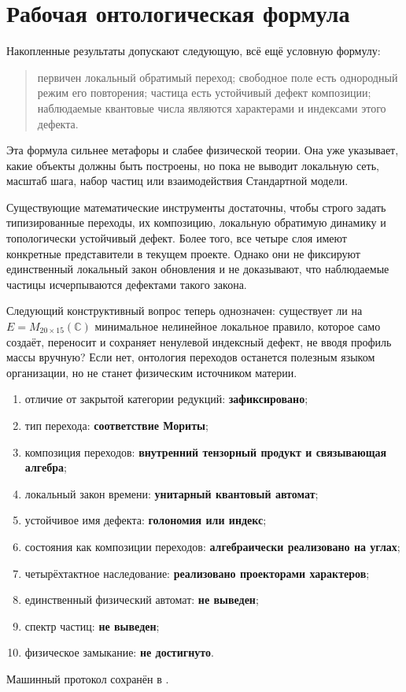 \section{Рабочая онтологическая формула}

Накопленные результаты допускают следующую, всё ещё условную формулу:
\begin{quote}
первичен локальный обратимый переход; свободное поле есть однородный режим
его повторения; частица есть устойчивый дефект композиции; наблюдаемые
квантовые числа являются характерами и индексами этого дефекта.
\end{quote}

Эта формула сильнее метафоры и слабее физической теории. Она уже указывает,
какие объекты должны быть построены, но пока не выводит локальную сеть,
масштаб шага, набор частиц или взаимодействия Стандартной модели.

\begin{theorem}
Существующие математические инструменты достаточны, чтобы строго задать
типизированные переходы, их композицию, локальную обратимую динамику и
топологически устойчивый дефект. Более того, все четыре слоя имеют
конкретные представители в текущем проекте. Однако они не фиксируют
единственный локальный закон обновления и не доказывают, что наблюдаемые
частицы исчерпываются дефектами такого закона.
\end{theorem}

Следующий конструктивный вопрос теперь однозначен: существует ли на
$E=M_{20\times15}(\mathbb C)$ минимальное нелинейное локальное правило,
которое само создаёт, переносит и сохраняет ненулевой индексный дефект,
не вводя профиль массы вручную? Если нет, онтология переходов останется
полезным языком организации, но не станет физическим источником материи.

\begin{protocol}
\begin{enumerate}
 \item отличие от закрытой категории редукций: \textbf{зафиксировано};
 \item тип перехода: \textbf{соответствие Мориты};
 \item композиция переходов: \textbf{внутренний тензорный продукт и
 связывающая алгебра};
 \item локальный закон времени: \textbf{унитарный квантовый автомат};
 \item устойчивое имя дефекта: \textbf{голономия или индекс};
 \item состояния как композиции переходов: \textbf{алгебраически
 реализовано на углах};
 \item четырёхтактное наследование: \textbf{реализовано проекторами
 характеров};
 \item единственный физический автомат: \textbf{не выведен};
 \item спектр частиц: \textbf{не выведен};
 \item физическое замыкание: \textbf{не достигнуто}.
\end{enumerate}
\end{protocol}

Машинный протокол сохранён в
.